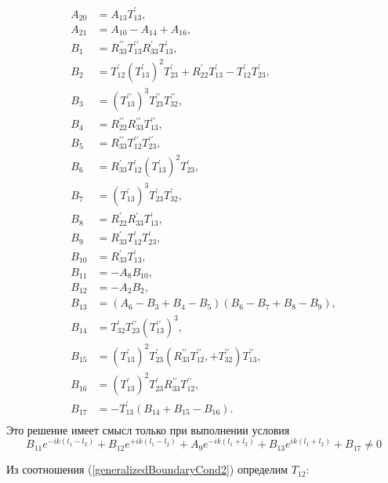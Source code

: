 \documentclass[a4 paper, 12 pt]{extarticle}
\begin{document}
   \[\begin{aligned}
   A_{20} &= A_{13} T_{13}^\prime, \\
   A_{21} &= A_{10} - A_{14} + A_{16}, \\
   B_1 &= R_{33}^{\prime\prime} T_{13}^{\prime\prime} R_{33}^\prime T_{13}^\prime,  \\
   B_2 &= T_{12}^\prime (T_{13}^\prime)^2 T_{23}^\prime + R_{22}^\prime T_{13}^\prime - T_{12}^\prime T_{23}^\prime, \\
   B_3 &= (T_{13}^{\prime\prime})^3 T_{23}^{\prime\prime} T_{32}^{\prime\prime},  \\
   B_4 &= R_{22}^{\prime\prime} R_{33}^{\prime\prime} T_{13}^{\prime\prime}, \\
   B_5 &= R_{33}^{\prime\prime} T_{12}^{\prime\prime} T_{23}^{\prime\prime}, \\
   B_6 &= R_{33}^\prime T_{12}^\prime (T_{13}^\prime)^2 T_{23}^\prime, \\
   B_7 &= (T_{13}^\prime)^3 T_{23}^\prime T_{32}^\prime, \\
   B_8 &= R_{22}^\prime R_{33}^\prime T_{13}^\prime, \\
   B_9 &= R_{33}^\prime T_{12}^\prime T_{23}^\prime, \\
   B_{10} &= R_{33}^\prime T_{13}^\prime, \\
   B_{11} &= -A_8 B_{10}, \\
   B_{12} &= -A_2 B_2, \\
   B_{13} &= (A_6 - B_3 + B_4 - B_5)(B_6-B_7+B_8-B_9), \\
   B_{14} &= T_{32}^\prime T_{23}^{\prime\prime}(T_{13}^{\prime\prime})^3, \\
   B_{15} &= (T_{13}^\prime)^2 T_{23}^\prime(R_{33}^{\prime\prime} T_{12}^{\prime\prime}, + T_{32}^{\prime\prime})T_{13}^{\prime\prime}, \\
   B_{16} &= (T_{13}^\prime)^2 T_{23}^\prime R_{33}^{\prime\prime} T_{12}^{\prime\prime}, \\
   B_{17} &= -T_{13}^\prime(B_{14}+B_{15}-B_{16}). \\
   \end{aligned}
   \]
   Это решение имеет смысл только при выполнении условия
   \begin{equation}
   \label{cond1}
   {B_{11} e^{-ik\left(l_1-l_2\right)} + B_{12}e^{+ik\left(l_1-l_2\right)} + A_9 e^{-ik\left(l_1+l_2\right)} + B_{13}e^{ik\left(l_1+l_2\right)} + B_{17}} \neq 0
   \end{equation}
   
   Из соотношения (\ref{generalizedBoundaryCond2}) определим $T_{12}$:
   
\end{document}
